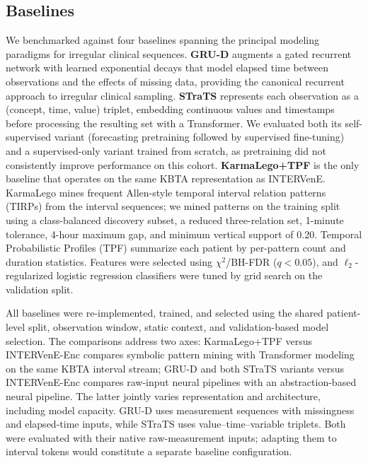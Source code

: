 \documentclass[letterpaper]{article} %
\begin{document}
\subsection{Baselines}

We benchmarked against four baselines spanning the principal modeling paradigms for irregular clinical sequences. \textbf{GRU-D} \citep{che2018recurrent} augments a gated recurrent network with learned exponential decays that model elapsed time between observations and the effects of missing data, providing the canonical recurrent approach to irregular clinical sampling. \textbf{STraTS} \citep{tipirneni2022strats} represents each observation as a (concept, time, value) triplet, embedding continuous values and timestamps before processing the resulting set with a Transformer. We evaluated both its self-supervised variant (forecasting pretraining followed by supervised fine-tuning) and a supervised-only variant trained from scratch, as pretraining did not consistently improve performance on this cohort. \textbf{KarmaLego+TPF} is the only baseline that operates on the same KBTA representation as INTERVenE. KarmaLego \citep{moskovitch2015karmalego} mines frequent Allen-style temporal interval relation patterns (TIRPs) from the interval sequences; we mined patterns on the training split using a class-balanced discovery subset, a reduced three-relation set, 1-minute tolerance, 4-hour maximum gap, and minimum vertical support of 0.20. Temporal Probabilistic Profiles (TPF) \citep{sheetrit2019tpf} summarize each patient by per-pattern count and duration statistics. Features were selected using $\chi^2$/BH-FDR ($q<0.05$), and $\ell_2$-regularized logistic regression classifiers were tuned by grid search on the validation split.

All baselines were re-implemented, trained, and selected using the shared patient-level split, observation window, static context, and validation-based model selection. The comparisons address two axes: KarmaLego+TPF versus INTERVenE-Enc compares symbolic pattern mining with Transformer modeling on the same KBTA interval stream; GRU-D and both STraTS variants versus INTERVenE-Enc compares raw-input neural pipelines with an abstraction-based neural pipeline. The latter jointly varies representation and architecture, including model capacity. GRU-D uses measurement sequences with missingness and elapsed-time inputs, while STraTS uses value--time--variable triplets. Both were evaluated with their native raw-measurement inputs; adapting them to interval tokens would constitute a separate baseline configuration.
\end{document}
